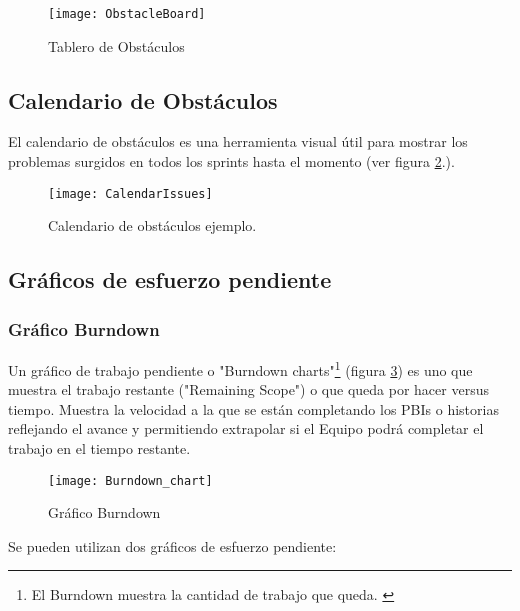 \begin{figure}[h]
  \centering
  \texttt{[image: ObstacleBoard]}
  \caption{Tablero de Obstáculos}
  \centering
  \label{fig:ObstacleBoard} %
\end{figure}

\subsection{Calendario de Obstáculos}

El calendario de obstáculos es una herramienta visual útil para mostrar los problemas surgidos en todos los sprints hasta el momento (ver figura \ref{fig:CalendarIssues}.).

\begin{figure}[h]
  \centering
  \texttt{[image: CalendarIssues]}
  \caption{Calendario de obstáculos ejemplo.}
  \centering
  \label{fig:CalendarIssues} %
\end{figure}

\subsection{Gráficos de esfuerzo pendiente}

\subsubsection{Gráfico Burndown}

Un gráfico de trabajo pendiente o "Burndown charts"\footnote{El Burndown muestra la cantidad de trabajo que queda. \cite{SBOK-2013}} (figura \ref{fig:Burndown_chart}) es uno que muestra el trabajo restante ("Remaining Scope") o que queda por hacer versus tiempo. Muestra la velocidad a la que se están completando los PBIs o historias reflejando el avance y permitiendo extrapolar si el Equipo podrá completar el trabajo en el tiempo restante.

\begin{figure}[h]
  \centering
  \texttt{[image: Burndown\_chart]}
  \caption{Gráfico Burndown}
  \centering
  \label{fig:Burndown_chart} %
\end{figure}

Se pueden utilizan dos gráficos de esfuerzo pendiente:

